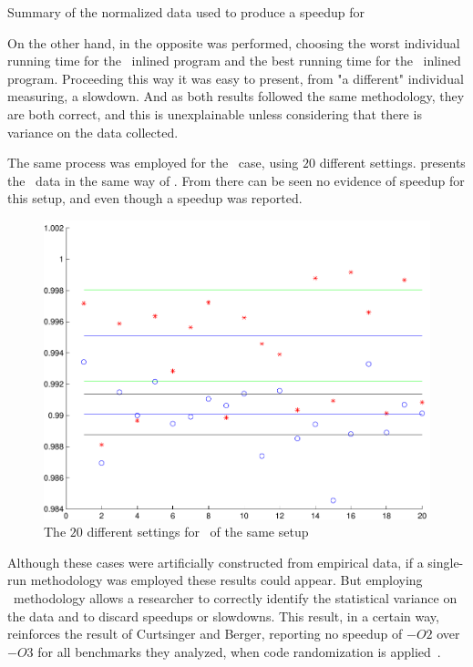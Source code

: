 \begin{table}
  \centering
  \begin{tiny}
  
  \end{tiny}
  \caption{Summary of the normalized data used to produce a speedup for \bzip}
  \label{tab:fullexp}
\end{table}

On the other hand, in  the opposite was performed, choosing the worst individual running time for the \FDI\ inlined program and the best running time for the \llvm\ inlined program. Proceeding this way it was easy to present, from "a different" individual measuring, a slowdown. And as both results followed the same methodology, they are both correct, and this is unexplainable unless considering that there is variance on the data collected.

The same process was employed for the \gzip\ case, using $20$ different settings.  presents the \gzip\ data in the same way of . From  there can be seen no evidence of speedup for this setup, and even though a speedup was reported.

\begin{figure}
  \centering
  \includegraphics[width=1.00\linewidth]{Figures/gzipfdll}
  \caption{The $20$ different settings for \gzip\ of the same setup}
  \label{fig:gzipfdll}
\end{figure}

Although these cases were artificially constructed from empirical data, if a single-run methodology was employed these results could appear. But employing \CP\ methodology allows a researcher to correctly identify the statistical variance on the data and to discard speedups or slowdowns. This result, in a certain way, reinforces the result of Curtsinger and Berger, reporting no speedup of $-O2$ over $-O3$ for all benchmarks they analyzed, when code randomization is applied~\cite{Curtsinger2013}.

